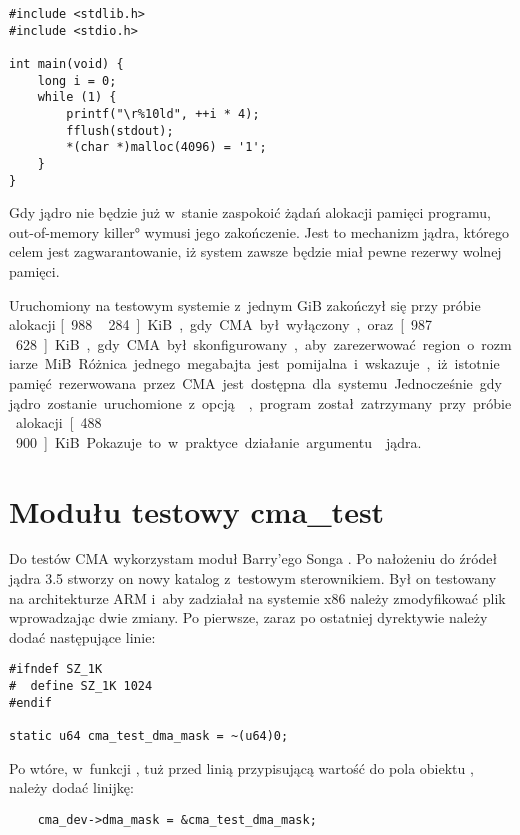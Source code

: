 \begin{lstlisting}[float=tb,caption=Prosty program testujący alokację
    pamięci.,label=lst:malloc]
#include <stdlib.h>
#include <stdio.h>

int main(void) {
	long i = 0;
	while (1) {
		printf("\r%10ld", ++i * 4);
		fflush(stdout);
		*(char *)malloc(4096) = '1';
	}
}
\end{lstlisting}

Gdy jądro nie będzie już w~stanie zaspokoić żądań alokacji pamięci
programu, \ang*{out-of-memory killer} wymusi jego zakończenie.  Jest
to mechanizm jądra, którego celem jest zagwarantowanie, iż system
zawsze będzie miał pewne rezerwy wolnej pamięci.

Uruchomiony na testowym systemie z~jednym GiB zakończył się przy
próbie alokacji \unit[988\,284]{KiB}, gdy CMA był wyłączony, oraz
\unit[987\,628]{KiB}, gdy CMA był skonfigurowany, aby zarezerwować
region o~rozmiarze \unit[512]{MiB}.  Różnica jednego megabajta jest
pomijalna i~wskazuje, iż istotnie pamięć rezerwowana przez CMA jest
dostępna dla systemu.

Jednocześnie gdy jądro zostanie uruchomione z~opcją ,
program został zatrzymany przy próbie alokacji \unit[488\,900]{KiB}.
Pokazuje to w~praktyce działanie argumentu  jądra.


\section{Modułu testowy cma\_test}

Do testów CMA wykorzystam moduł Barry'ego Songa
\autocite{patch:cma-test}.  Po nałożeniu do źródeł jądra 3.5 stworzy
on nowy katalog  z~testowym sterownikiem.  Był on
testowany na architekturze ARM i~aby zadziałał na systemie x86 należy
zmodyfikować plik  wprowadzając dwie zmiany.  Po
pierwsze, zaraz po ostatniej dyrektywie  należy dodać
następujące linie:

\begin{lstlisting}
#ifndef SZ_1K
#  define SZ_1K 1024
#endif

static u64 cma_test_dma_mask = ~(u64)0;
\end{lstlisting}

Po wtóre, w~funkcji , tuż przed linią przypisującą
wartość do pola  obiektu ,
należy dodać linijkę:

\begin{lstlisting}
	cma_dev->dma_mask = &cma_test_dma_mask;
\end{lstlisting}

